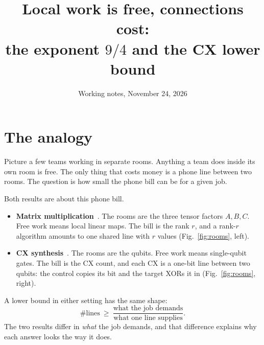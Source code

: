 \documentclass[11pt]{article}
\title{Local work is free, connections cost:\\ the exponent $9/4$ and the CX lower bound}
\date{Working notes, November 24, 2026}
\begin{document}
\maketitle

\section*{The analogy}

Picture a few teams working in separate rooms. Anything a team does inside its own room is free.
The only thing that costs money is a phone line between two rooms. The question is how small the
phone bill can be for a given job.

Both results are about this phone bill.
\begin{itemize}
\item \textbf{Matrix multiplication}~\cite{mm94}. The rooms are the three tensor factors $A,B,C$.
  Free work means local linear maps. The bill is the rank $r$, and a rank-$r$ algorithm amounts to
  one shared line with $r$ values (Fig.~\ref{fig:rooms}, left).
\item \textbf{CX synthesis}~\cite{smb2q}. The rooms are the qubits. Free work means single-qubit
  gates. The bill is the CX count, and each CX is a one-bit line between two qubits: the control
  copies its bit and the target XORs it in (Fig.~\ref{fig:rooms}, right).
\end{itemize}
A lower bound in either setting has the same shape:
\[
\#\text{lines}\ \ge\ \frac{\text{what the job demands}}{\text{what one line supplies}} .
\]
The two results differ in \emph{what} the job demands, and that difference explains why each
answer looks the way it does.
\end{document}
